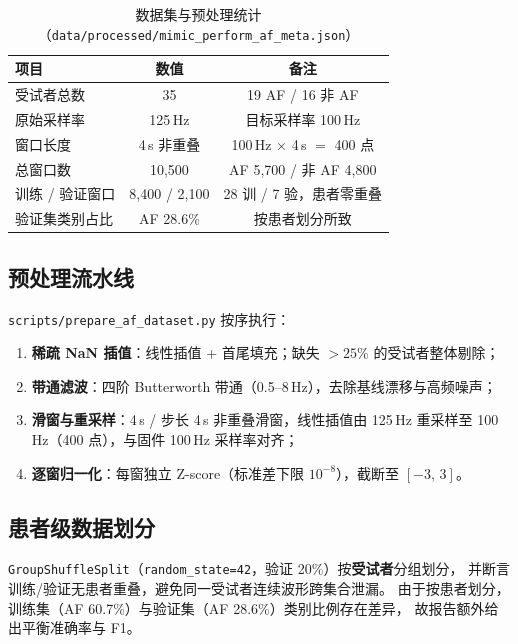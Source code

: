 \documentclass[11pt,a4paper]{ctexart}
\newcommand{\feat}[1]{\texttt{#1}}
\begin{document}
\begin{table}[htbp]
\centering
\caption{数据集与预处理统计（\feat{data/processed/mimic\_perform\_af\_meta.json}）}
\label{tab:dataset}
\begin{tabular}{lcc}
\toprule
项目 & 数值 & 备注 \\
\midrule
受试者总数 & 35 & 19 AF / 16 非 AF \\
原始采样率 & 125\,Hz & 目标采样率 100\,Hz \\
窗口长度 & 4\,s 非重叠 & 100\,Hz $\times$ 4\,s $=$ 400 点 \\
总窗口数 & 10{,}500 & AF 5{,}700 / 非 AF 4{,}800 \\
训练 / 验证窗口 & 8{,}400 / 2{,}100 & 28 训 / 7 验，患者零重叠 \\
验证集类别占比 & AF 28.6\% & 按患者划分所致 \\
\bottomrule
\end{tabular}
\end{table}

\subsection{预处理流水线}
\label{sec:preprocessing}

\feat{scripts/prepare\_af\_dataset.py} 按序执行：

\begin{enumerate}
  \item \textbf{稀疏 NaN 插值}：线性插值 + 首尾填充；缺失 $>25\%$ 的受试者整体剔除；
  \item \textbf{带通滤波}：四阶 Butterworth 带通（0.5--8\,Hz），去除基线漂移与高频噪声；
  \item \textbf{滑窗与重采样}：4\,s / 步长 4\,s 非重叠滑窗，线性插值由 125\,Hz 重采样至
        100\,Hz（400 点），与固件 100\,Hz 采样率对齐；
  \item \textbf{逐窗归一化}：每窗独立 Z-score（标准差下限 $10^{-8}$），截断至 $[-3,\,3]$。
\end{enumerate}

\subsection{患者级数据划分}
\label{sec:split}

\feat{GroupShuffleSplit}（\feat{random\_state=42}，验证 20\%）按\textbf{受试者}分组划分，
并断言训练/验证无患者重叠，避免同一受试者连续波形跨集合泄漏。
由于按患者划分，训练集（AF 60.7\%）与验证集（AF 28.6\%）类别比例存在差异，
故报告额外给出平衡准确率与 F1。
\end{document}
